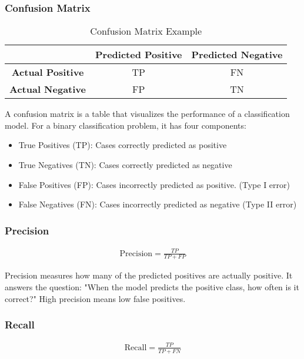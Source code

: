 \subsubsection{Confusion Matrix}
\begin{table}[h]
	\centering
	\begin{tabular}{c|c|c}
	\hline
	& \textbf{Predicted Positive} & \textbf{Predicted Negative} \\
	\hline
	\textbf{Actual Positive} & TP & FN \\
	\hline
	\textbf{Actual Negative} & FP & TN \\
	\hline
	\end{tabular}
	\caption{Confusion Matrix Example}
	\label{tab:confusion_matrix}
\end{table}
A confusion matrix is a table that visualizes the performance 
of a classification model. For a binary classification problem, it has four components:
\begin{itemize}
	\item True Positives (TP): Cases correctly predicted as positive
	\item True Negatives (TN): Cases correctly predicted as negative
	\item False Positives (FP): Cases incorrectly predicted as positive. (Type I error)
	\item False Negatives (FN): Cases incorrectly predicted as negative (Type II error)
\end{itemize}

\subsubsection{Precision}
\begin{eqnarray}
	\text{Precision} = \frac{TP}{TP + FP}
	\label{eq:precision}
\end{eqnarray}

Precision measures how many of the predicted positives are actually positive. It answers the question: 
"When the model predicts the positive class, how often is it correct?" High precision means low false positives.

\subsubsection{Recall}
\begin{eqnarray}
	\text{Recall} = \frac{TP}{TP + FN}
	\label{eq:recall}
\end{eqnarray}

